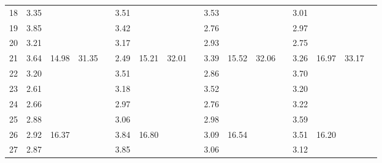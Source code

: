 \begin{center}
\begin{tabular}{| l || c | c | c | c | c | c | c | c | c | c | c | c | c | c | c | c |}
18 & \multirow{1}{*}{ 3.35 }  & & & & \multirow{1}{*}{ 3.51 }  & & & & \multirow{1}{*}{ 3.53 }  & & & & \multirow{1}{*}{ 3.01 }  & & & \\\cline{2-2}\cline{6-6}\cline{10-10}\cline{14-14}
19 & \multirow{1}{*}{ 3.85 }  & & & & \multirow{1}{*}{ 3.42 }  & & & & \multirow{1}{*}{ 2.76 }  & & & & \multirow{1}{*}{ 2.97 }  & & & \\\cline{2-2}\cline{6-6}\cline{10-10}\cline{14-14}
20 & \multirow{1}{*}{ 3.21 }  & & & & \multirow{1}{*}{ 3.17 }  & & & & \multirow{1}{*}{ 2.93 }  & & & & \multirow{1}{*}{ 2.75 }  & & & \\\cline{2-2}\cline{6-6}\cline{10-10}\cline{14-14}\cline{3-3}\cline{7-7}\cline{11-11}\cline{15-15}\cline{4-4}\cline{8-8}\cline{12-12}\cline{16-16}
21 & \multirow{1}{*}{ 3.64 }  & \multirow{5}{*}{ 14.98 }  & \multirow{10}{*}{ 31.35 }  & & \multirow{1}{*}{ 2.49 }  & \multirow{5}{*}{ 15.21 }  & \multirow{10}{*}{ 32.01 }  & & \multirow{1}{*}{ 3.39 }  & \multirow{5}{*}{ 15.52 }  & \multirow{10}{*}{ 32.06 }  & & \multirow{1}{*}{ 3.26 }  & \multirow{5}{*}{ 16.97 }  & \multirow{10}{*}{ 33.17 }  & \\\cline{2-2}\cline{6-6}\cline{10-10}\cline{14-14}
22 & \multirow{1}{*}{ 3.20 }  & & & & \multirow{1}{*}{ 3.51 }  & & & & \multirow{1}{*}{ 2.86 }  & & & & \multirow{1}{*}{ 3.70 }  & & & \\\cline{2-2}\cline{6-6}\cline{10-10}\cline{14-14}
23 & \multirow{1}{*}{ 2.61 }  & & & & \multirow{1}{*}{ 3.18 }  & & & & \multirow{1}{*}{ 3.52 }  & & & & \multirow{1}{*}{ 3.20 }  & & & \\\cline{2-2}\cline{6-6}\cline{10-10}\cline{14-14}
24 & \multirow{1}{*}{ 2.66 }  & & & & \multirow{1}{*}{ 2.97 }  & & & & \multirow{1}{*}{ 2.76 }  & & & & \multirow{1}{*}{ 3.22 }  & & & \\\cline{2-2}\cline{6-6}\cline{10-10}\cline{14-14}
25 & \multirow{1}{*}{ 2.88 }  & & & & \multirow{1}{*}{ 3.06 }  & & & & \multirow{1}{*}{ 2.98 }  & & & & \multirow{1}{*}{ 3.59 }  & & & \\\cline{2-2}\cline{6-6}\cline{10-10}\cline{14-14}\cline{3-3}\cline{7-7}\cline{11-11}\cline{15-15}
26 & \multirow{1}{*}{ 2.92 }  & \multirow{5}{*}{ 16.37 }  & & & \multirow{1}{*}{ 3.84 }  & \multirow{5}{*}{ 16.80 }  & & & \multirow{1}{*}{ 3.09 }  & \multirow{5}{*}{ 16.54 }  & & & \multirow{1}{*}{ 3.51 }  & \multirow{5}{*}{ 16.20 }  & & \\\cline{2-2}\cline{6-6}\cline{10-10}\cline{14-14}
27 & \multirow{1}{*}{ 2.87 }  & & & & \multirow{1}{*}{ 3.85 }  & & & & \multirow{1}{*}{ 3.06 }  & & & & \multirow{1}{*}{ 3.12 }  & & & \\\cline{2-2}\cline{6-6}\cline{10-10}\cline{14-14}

\end{tabular}
\end{center}
